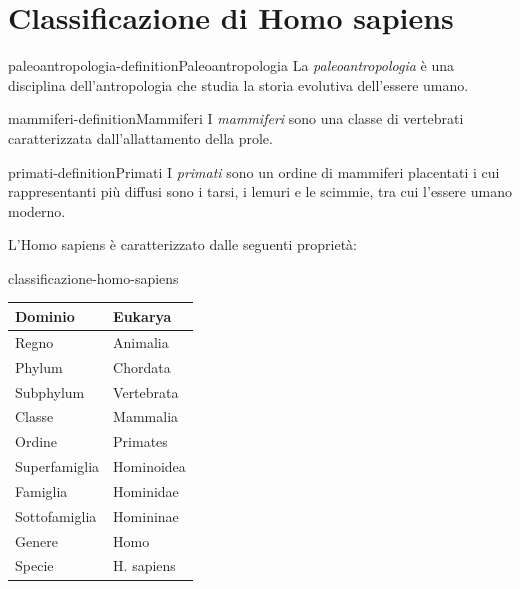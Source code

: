 \documentclass[preview]{standalone}
\begin{document}
\genpage

\section{Classificazione di Homo sapiens}

\begin{snippetdefinition}{paleoantropologia-definition}{Paleoantropologia}
    La \textit{paleoantropologia} è una disciplina dell'antropologia che studia la storia evolutiva
    dell'essere umano.
\end{snippetdefinition}

\begin{snippetdefinition}{mammiferi-definition}{Mammiferi}
    I \textit{mammiferi} sono una classe di vertebrati caratterizzata dall'allattamento della prole. 
\end{snippetdefinition}

\begin{snippetdefinition}{primati-definition}{Primati}
    I \textit{primati} sono un ordine di mammiferi placentati i cui rappresentanti
    più diffusi sono i tarsi, i lemuri e le scimmie, tra cui l'essere umano moderno. 
\end{snippetdefinition}

\begin{plainhtml}
    L'Homo sapiens è caratterizzato dalle seguenti proprietà:
\end{plainhtml}

\begin{snippet}{classificazione-homo-sapiens}
    \vspace{0.25cm}
    \begin{center}
        \begin{tabular}{|l|l|}
            \hline Dominio & Eukarya \\
            \hline Regno & Animalia \\
            \hline Phylum & Chordata \\
            \hline Subphylum & Vertebrata \\
            \hline Classe & Mammalia \\
            \hline Ordine & Primates \\
            \hline Superfamiglia & Hominoidea \\
            \hline Famiglia & Hominidae \\
            \hline Sottofamiglia & Homininae \\
            \hline Genere & Homo \\
            \hline Specie & H. sapiens \\
            \hline
        \end{tabular}
    \end{center}
    \vspace{0.25cm}
\end{snippet}
\end{document}
